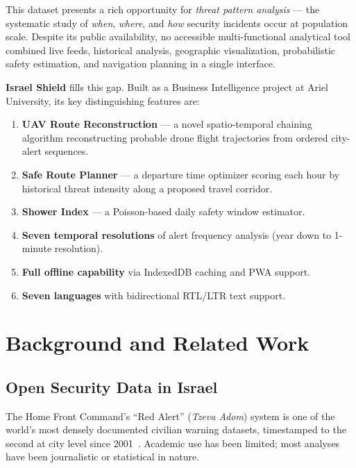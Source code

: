\documentclass[12pt,a4paper]{article}
\newcommand{\heb}[1]{\textit{#1}}   %
\begin{document}
This dataset presents a rich opportunity for \emph{threat pattern analysis} ---
the systematic study of \emph{when}, \emph{where}, and \emph{how} security
incidents occur at population scale. Despite its public availability, no accessible
multi-functional analytical tool combined live feeds, historical analysis,
geographic visualization, probabilistic safety estimation, and navigation planning
in a single interface.

\textbf{Israel Shield} fills this gap. Built as a Business Intelligence project at
Ariel University, its key distinguishing features are:

\begin{enumerate}
  \item \textbf{UAV Route Reconstruction} --- a novel spatio-temporal chaining
        algorithm reconstructing probable drone flight trajectories from ordered
        city-alert sequences.
  \item \textbf{Safe Route Planner} --- a departure time optimizer scoring each
        hour by historical threat intensity along a proposed travel corridor.
  \item \textbf{Shower Index} --- a Poisson-based daily safety window estimator.
  \item \textbf{Seven temporal resolutions} of alert frequency analysis
        (year down to 1-minute resolution).
  \item \textbf{Full offline capability} via IndexedDB caching and PWA support.
  \item \textbf{Seven languages} with bidirectional RTL/LTR text support.
\end{enumerate}

\section{Background and Related Work}
\label{sec:background}

\subsection{Open Security Data in Israel}
The Home Front Command's ``Red Alert'' (\heb{Tzeva Adom}) system is one of the
world's most densely documented civilian warning datasets, timestamped to the
second at city level since 2001~\cite{harpaz2023}. Academic use has been limited;
most analyses have been journalistic or statistical in nature.
\end{document}
